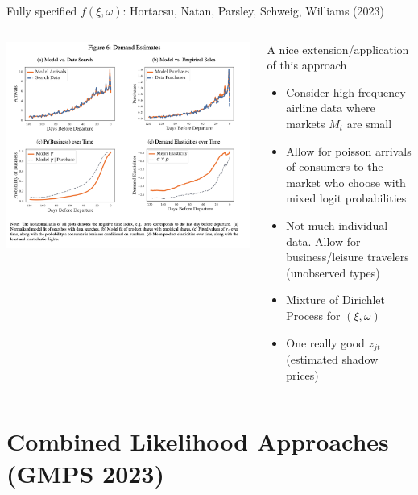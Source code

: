 \begin{frame}{Fully specified $f(\xi,\omega)$: Hortacsu, Natan, Parsley, Schweig, Williams (2023)}

\begin{columns}
\begin{column}{0.5\textwidth}
     \includegraphics[width=\textwidth]{resources/williams_2023}      
\end{column}
\begin{column}{0.5\textwidth}
A nice extension/application of this approach
\begin{itemize}
    \item Consider high-frequency airline data where markets $M_t$ are \alert{small}
    \item Allow for poisson arrivals of consumers to the market who choose with mixed logit probabilities
    \item Not much individual data. Allow for business/leisure travelers (unobserved types)
    \item Mixture of Dirichlet Process for $(\xi, \omega)$
    \item One really good $z_{jt}$ (estimated shadow prices)
\end{itemize}
\end{column}
\end{columns}


\end{frame}

\section*{Combined Likelihood Approaches (GMPS 2023)}


